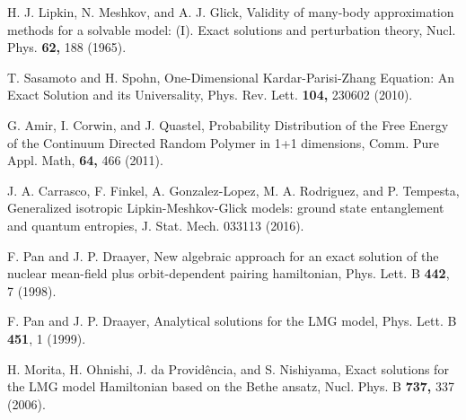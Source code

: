 \documentclass[
aps,
pre,
showpacs
]{revtex4-1}
\begin{document}
\begin{thebibliography}{99}
H. J. Lipkin, N. Meshkov, and A. J. Glick,
{Validity of many-body approximation methods for a solvable model: (I). Exact solutions and perturbation theory},
Nucl. Phys. {\bf62,} 188 (1965).




T. Sasamoto and H. Spohn,
{One-Dimensional Kardar-Parisi-Zhang Equation: An Exact Solution and its Universality},
Phys. Rev. Lett. {\bf104,} 230602 (2010).

G. Amir, I. Corwin, and J. Quastel,
{Probability Distribution of the Free Energy of the Continuum Directed Random Polymer in 1+1 dimensions},
Comm. Pure Appl. Math, {\bf64,} 466 (2011).

J. A. Carrasco, F. Finkel, A. Gonzalez-Lopez, M. A. Rodriguez, and P. Tempesta,
{Generalized isotropic Lipkin-Meshkov-Glick models: ground state entanglement and quantum entropies},
J. Stat. Mech. 033113 (2016).

F. Pan and J. P. Draayer,
{New algebraic approach for an exact solution of the nuclear mean-field plus orbit-dependent pairing hamiltonian},
Phys. Lett. B {\bf442}, 7 (1998).

F. Pan and J. P. Draayer,
{Analytical solutions for the LMG model},
Phys. Lett. B {\bf451}, 1 (1999).

H. Morita, H. Ohnishi, J. da Provid\^{e}ncia, and S. Nishiyama,
{Exact solutions for the LMG model Hamiltonian based on the Bethe ansatz},
Nucl. Phys. B {\bf737,} 337 (2006).


\end{thebibliography}
\end{document}
